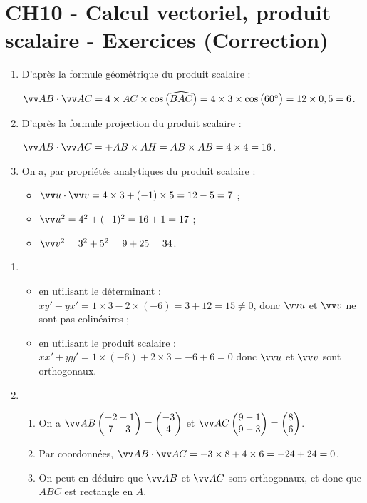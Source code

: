 \documentclass[a4paper,11pt]{article}
\author{Pierquet}
\title{\nomfichier}
\begin{document}
\pagestyle{fancy}

\part{CH10 - Calcul vectoriel, produit scalaire - Exercices (Correction)}

\smallskip


\begin{enumerate}
	\item D'après la \og formule géométrique \fg{} du produit scalaire :
	
	
	$\vect{AB}\cdot\vect{AC}=4 \times AC \times \cos\big(\widehat{BAC}\big) = 4 \times 3 \times \cos\big(60^{\circ}\big)=12 \times 0,5 = 6$.
	\item D'après la \og formule projection \fg{} du produit scalaire :
	
	$\vect{AB}\cdot\vect{AC} = +AB \times AH = AB \times AB = 4 \times 4 = 16$.
	\item On a, par propriétés \og analytiques \fg{} du produit scalaire :
	\begin{itemize}
		\item $\vect{u}\cdot\vect{v}=4 \times 3 + (-1) \times 5 = 12-5=7$ ;
		\item $\vect{u}^2=4^2+(-1)^2=16+1=17$ ;
		\item $\vect{v}^2=3^2+5^2=9+25=34$.
	\end{itemize}
\end{enumerate}

\medskip


\begin{enumerate}
	\item 
	\begin{itemize}
		\item en utilisant le déterminant : $xy'-yx'=1 \times 3 - 2 \times (-6)=3+12=15 \neq0$, donc $\vect{u}$ et $\vect{v}$ ne sont pas colinéaires ;
		\item en utilisant le produit scalaire : $xx'+yy'=1\times(-6)+2\times3=-6+6=0$ donc $\vect{u}$ et $\vect{v}$ sont orthogonaux.
	\end{itemize}
	\item 
	\begin{enumerate}
		\item On a $\vect{AB}\coordeux{-2-1}{7-3}=\coordeux{-3}{4}$ et $\vect{AC}\coordeux{9-1}{9-3}=\coordeux{8}{6}$.
		\item Par coordonnées, $\vect{AB}\cdot\vect{AC}=-3\times8+4\times6=-24+24=0$.
		\item On peut en déduire que $\vect{AB}$ et $\vect{AC}$ sont orthogonaux, et donc que $ABC$ est rectangle en $A$.
	\end{enumerate}
\end{enumerate}
\end{document}
